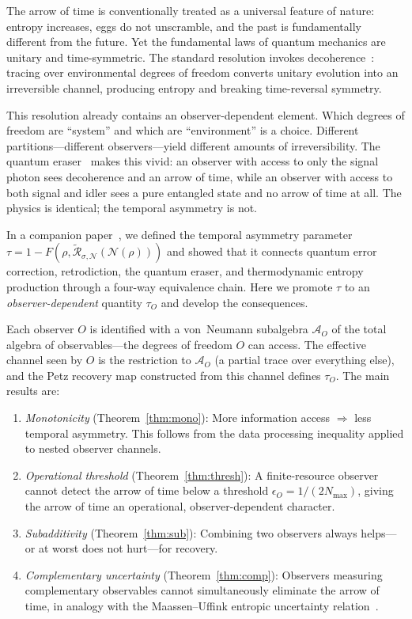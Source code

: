 \documentclass[prl,twocolumn,superscriptaddress,longbibliography,floatfix]{revtex4-2}
\newcommand{\Petz}{\mathcal{R}}
\newcommand{\chan}{\mathcal{N}}
\newcommand{\tauasym}{\tau}
\newcommand{\algO}{\mathcal{A}}
\begin{document}
The arrow of time is conventionally treated as a universal
feature of nature: entropy increases, eggs do not unscramble,
and the past is fundamentally different from the future.  Yet
the fundamental laws of quantum mechanics are unitary and
time-symmetric.  The standard resolution invokes
decoherence~\cite{Zurek2003,Zeh1970}: tracing over environmental
degrees of freedom converts unitary evolution into an
irreversible channel, producing entropy and breaking
time-reversal symmetry.

This resolution already contains an observer-dependent element.
Which degrees of freedom are ``system'' and which are
``environment'' is a choice.  Different partitions---different
observers---yield different amounts of irreversibility.  The
quantum eraser~\cite{Scully1982,Kim2000} makes this vivid:
an observer with access to only the signal photon sees
decoherence and an arrow of time, while an observer with access
to both signal and idler sees a pure entangled state and no
arrow of time at all.  The physics is identical; the temporal
asymmetry is not.

In a companion paper~\cite{Paper1}, we defined the temporal
asymmetry parameter $\tauasym = 1 - F(\rho,
\tilde{\Petz}_{\sigma,\chan}(\chan(\rho)))$ and showed that it
connects quantum error correction, retrodiction, the quantum
eraser, and thermodynamic entropy production through a four-way
equivalence chain.  Here we promote $\tauasym$ to an
\emph{observer-dependent} quantity $\tauasym_O$ and develop the
consequences.

Each observer $O$ is identified with a von~Neumann subalgebra
$\algO_O$ of the total algebra of observables---the degrees of
freedom $O$ can access.  The effective channel seen by $O$ is
the restriction to $\algO_O$ (a partial trace over everything
else), and the Petz recovery map constructed from this
channel defines $\tauasym_O$.  The main results are:

\begin{enumerate}
\item \emph{Monotonicity} (Theorem~\ref{thm:mono}):
  More information access $\Rightarrow$ less temporal asymmetry.
  This follows from the data processing inequality applied to
  nested observer channels.
\item \emph{Operational threshold} (Theorem~\ref{thm:thresh}):
  A finite-resource observer cannot detect the arrow of time
  below a threshold $\epsilon_O = 1/(2N_{\max})$, giving the
  arrow of time an operational, observer-dependent character.
\item \emph{Subadditivity} (Theorem~\ref{thm:sub}):
  Combining two observers always helps---or at worst does not
  hurt---for recovery.
\item \emph{Complementary uncertainty} (Theorem~\ref{thm:comp}):
  Observers measuring complementary observables cannot
  simultaneously eliminate the arrow of time, in analogy with the
  Maassen--Uffink entropic uncertainty
  relation~\cite{MaassenUffink1988}.
\end{enumerate}
\end{document}
